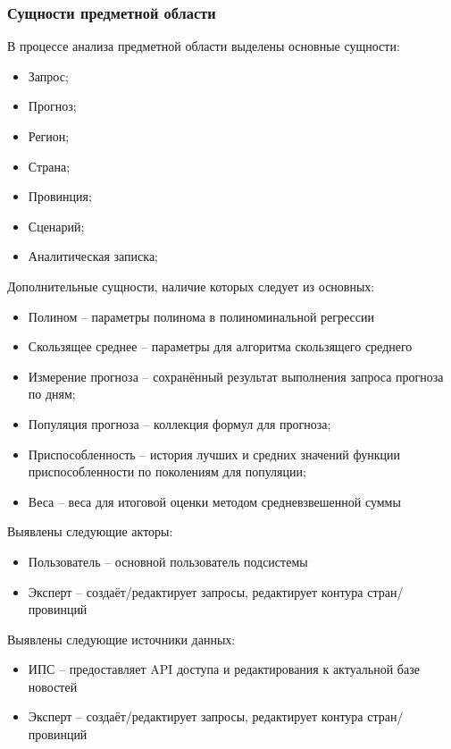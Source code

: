 \clearpage
\subsubsection{Сущности предметной области}

В процессе анализа предметной области выделены основные сущности:
\begin{itemize}
\item Запрос;
\item Прогноз;
\item Регион;
\item Страна;
\item Провинция;
\item Сценарий;
\item Аналитическая записка;
\end{itemize}

Дополнительные сущности, наличие которых следует из основных:
\begin{itemize}
\item Полином -- параметры полинома в полиноминальной регрессии
\item Скользящее среднее -- параметры для алгоритма скользящего среднего
\item Измерение прогноза -- сохранённый результат выполнения запроса прогноза по дням;
\item Популяция прогноза -- коллекция формул для прогноза;
\item Приспособленность -- история лучших и средних значений функции приспособленности по поколениям для популяции;
\item Веса -- веса для итоговой оценки методом средневзвешенной суммы
\end{itemize}

Выявлены следующие акторы:
\begin{itemize}
\item Пользователь -- основной пользователь подсистемы
\item Эксперт -- создаёт/редактирует запросы, редактирует контура стран/провинций
\end{itemize}

Выявлены следующие источники данных:
\begin{itemize}
\item ИПС -- предоставляет API доступа и редактирования к актуальной базе новостей
\item Эксперт -- создаёт/редактирует запросы, редактирует контура стран/провинций
\end{itemize}

